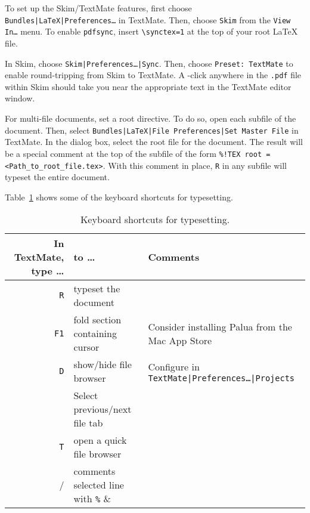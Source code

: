 \documentclass[10pt]{article}
\begin{document}
To set up the Skim/TextMate features, 
first choose \texttt{Bundles|LaTeX|Preferences\dots} in TextMate.
Then, choose \texttt{Skim} from the \texttt{View In\dots} menu.
To enable \texttt{pdfsync}, insert \verb!\synctex=1! 
at the top of your root \LaTeX{} file.

In Skim, choose \texttt{Skim|Preferences\dots|Sync}. 
Then, choose \texttt{Preset:~TextMate} to enable round-tripping from Skim to TextMate. 
A \cmdkey\shiftkey-click anywhere in the \texttt{.pdf} file within Skim 
should take you near the appropriate text in the TextMate editor window.

For multi-file documents, set a root directive. 
To do so, open each subfile of the document. 
Then, select \texttt{Bundles|LaTeX|File Preferences|Set Master File} in TextMate.
In the dialog box, select the root file for the document. 
The result will be a special comment at the top of the subfile of the form
\verb&%!TEX root = <Path_to_root_file.tex>&.
With this comment in place, \cmdkey\texttt{R} in any subfile will typeset the entire document.

Table~\ref{tab:typesetting_keyboard_shortcuts} shows some of the keyboard shortcuts for typesetting.

\begin{table}
\centering
\caption{Keyboard shortcuts for typesetting.}
\begin{tabular}{r|l|l}
	In TextMate, type \dots & to \dots      & Comments                  \\
	\hline
	\cmdkey\texttt{R}           & typeset the document            &                           \\
	\texttt{F1}                 & fold section containing cursor  & Consider installing Palua from the Mac App Store \\
	\ctlkey\optkey\cmdkey\texttt{D}&show/hide file browser        & Configure in \texttt{TextMate|Preferences\dots|Projects} \\
	\cmdkey\shiftkey [, \cmdkey\shiftkey ] & Select previous/next file tab  &          \\
	\cmdkey\texttt{T}           & open a quick file browser                 &          \\
	\cmdkey/                    & comments selected line with \verb!%!      &          \\
\end{tabular}
\label{tab:typesetting_keyboard_shortcuts}
\end{table}

\end{document}
